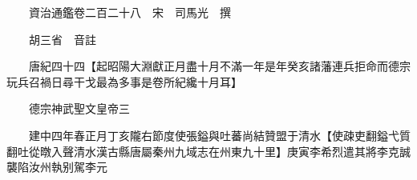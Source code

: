 










 


 
 


 

  
  
  
  
  





  
  
  
  
  
 
  

  

  
  
  



  

 
 

  
   




  

  
  


  　　資治通鑑卷二百二十八　宋　司馬光　撰

　　胡三省　音註

　　唐紀四十四【起昭陽大淵獻正月盡十月不滿一年是年癸亥諸藩連兵拒命而德宗玩兵召禍日尋干戈最為多事是卷所紀纔十月耳】

　　德宗神武聖文皇帝三

　　建中四年春正月丁亥隴右節度使張鎰與吐蕃尚結贊盟于清水【使疎吏翻鎰弋質翻吐從暾入聲清水漢古縣唐屬秦州九域志在州東九十里】庚寅李希烈遣其將李克誠襲陷汝州執别駕李元

